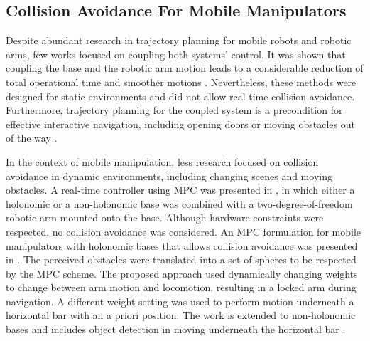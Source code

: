 \subsection{Collision Avoidance For Mobile Manipulators}
Despite abundant research in trajectory planning for mobile robots and robotic
arms, few works focused on coupling both systems' control. It was shown that
coupling the base and the robotic arm motion leads to a considerable reduction
of total operational time and smoother motions \cite{Thakar2018, Thakar2019}.
Nevertheless, these methods were designed for static environments and did not
allow real-time collision avoidance. Furthermore, trajectory planning for the
coupled system is a precondition for effective interactive navigation, including
opening doors \cite{Jain2009, Chitta2010} or moving obstacles out of the way
\cite{Li2019}.

In the context of mobile manipulation, less research focused on collision
avoidance in dynamic environments, including changing scenes and moving
obstacles. A real-time controller using MPC was presented in \cite{Ide2011}, in
which either a holonomic or a non\hyp{}holonomic base was combined with a
two-degree-of-freedom robotic arm mounted onto the base. Although hardware
constraints were respected, no collision avoidance was considered.  An MPC
formulation for mobile manipulators with holonomic bases that allows collision
avoidance was presented in \cite{Avanzini2015}. The perceived obstacles were
translated into a set of spheres to be respected by the MPC scheme. The proposed
approach used dynamically changing weights to change between arm motion and
locomotion, resulting in a locked arm during navigation. A different weight
setting was used to perform motion underneath a horizontal bar with an a priori
position. The work is extended to non\hyp{}holonomic bases and includes object
detection in moving underneath the horizontal bar \cite{Avanzini2018}. 
